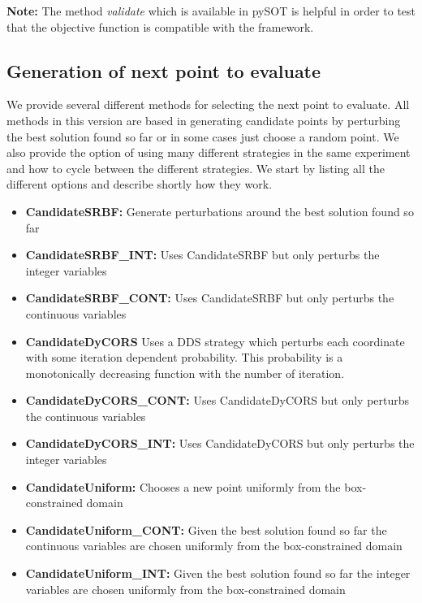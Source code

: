 \documentclass[]{article}
\begin{document}
\textbf{Note:} The method \textit{validate} which is available in pySOT is helpful in order to test that the objective function is compatible with the framework. \newline

\subsection{Generation of next point to evaluate} 
\label{search}
We provide several different methods for selecting the next point to evaluate. All methods in this version are based in generating candidate points by perturbing the best solution found so far or in some cases just choose a random point. We also provide the option of using many different strategies in the same experiment and how to cycle between the different strategies. We start by listing all the different options and describe shortly how they work.
\begin{itemize}
\item \textbf{CandidateSRBF:} Generate perturbations around the best solution found so far
\item \textbf{CandidateSRBF\_INT:} Uses CandidateSRBF but only perturbs the integer variables
\item \textbf{CandidateSRBF\_CONT:} Uses CandidateSRBF but only perturbs the continuous variables
\item \textbf{CandidateDyCORS} Uses a DDS strategy which perturbs each coordinate with some iteration dependent probability. This probability is a monotonically decreasing function with the number of iteration.
\item \textbf{CandidateDyCORS\_CONT:} Uses CandidateDyCORS but only perturbs the continuous variables
\item \textbf{CandidateDyCORS\_INT:} Uses CandidateDyCORS but only perturbs the integer variables
\item \textbf{CandidateUniform:} Chooses a new point uniformly from the box-constrained domain
\item \textbf{CandidateUniform\_CONT:} Given the best solution found so far the continuous variables are chosen uniformly from the box-constrained domain
\item \textbf{CandidateUniform\_INT:} Given the best solution found so far the integer variables are chosen uniformly from the box-constrained domain
\end{itemize}
\end{document}
